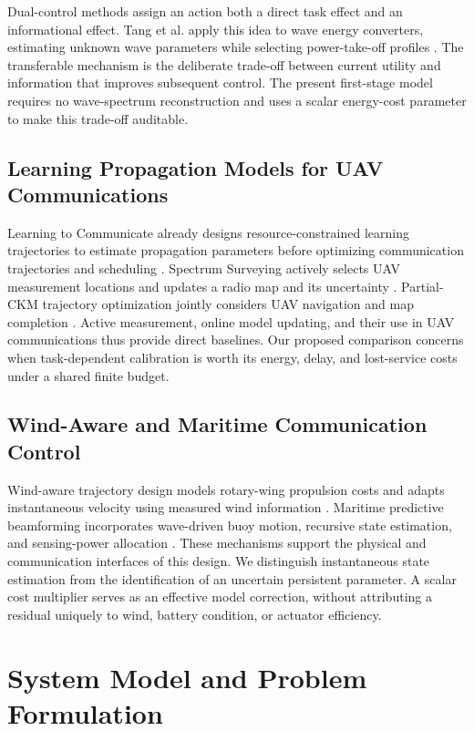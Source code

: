 \documentclass[10pt,twocolumn,letterpaper]{article}
\begin{document}
Dual-control methods assign an action both a direct task effect and an informational effect. Tang et al. apply this idea to wave energy converters, estimating unknown wave parameters while selecting power-take-off profiles \cite{tang2026auto}. The transferable mechanism is the deliberate trade-off between current utility and information that improves subsequent control. The present first-stage model requires no wave-spectrum reconstruction and uses a scalar energy-cost parameter to make this trade-off auditable.

\subsection{Learning Propagation Models for UAV Communications}
Learning to Communicate already designs resource-constrained learning trajectories to estimate propagation parameters before optimizing communication trajectories and scheduling \cite{esrafilian2019learning}. Spectrum Surveying actively selects UAV measurement locations and updates a radio map and its uncertainty \cite{shrestha2023spectrum}. Partial-CKM trajectory optimization jointly considers UAV navigation and map completion \cite{song2026partialckm}. Active measurement, online model updating, and their use in UAV communications thus provide direct baselines. Our proposed comparison concerns when task-dependent calibration is worth its energy, delay, and lost-service costs under a shared finite budget.

\subsection{Wind-Aware and Maritime Communication Control}
Wind-aware trajectory design models rotary-wing propulsion costs and adapts instantaneous velocity using measured wind information \cite{dai2024wind}. Maritime predictive beamforming incorporates wave-driven buoy motion, recursive state estimation, and sensing-power allocation \cite{li2026predictive}. These mechanisms support the physical and communication interfaces of this design. We distinguish instantaneous state estimation from the identification of an uncertain persistent parameter. A scalar cost multiplier serves as an effective model correction, without attributing a residual uniquely to wind, battery condition, or actuator efficiency.

\section{System Model and Problem Formulation}
\end{document}

